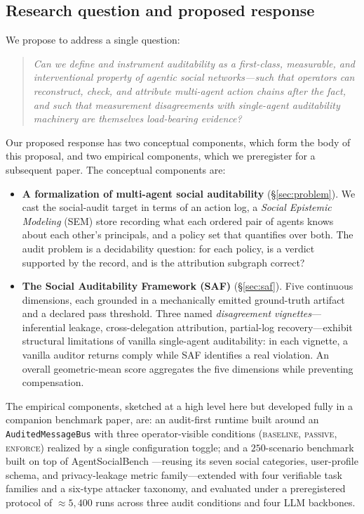 \documentclass{article}
\begin{document}
\subsection{Research question and proposed response}
\label{sec:motivation:rq}

We propose to address a single question:
\begin{quote}
\emph{Can we define and instrument auditability as a first-class, measurable, and interventional property of agentic social networks---such that operators can reconstruct, check, and attribute multi-agent action chains after the fact, and such that measurement disagreements with single-agent auditability machinery are themselves load-bearing evidence?}
\end{quote}

Our proposed response has two conceptual components, which form the body of this proposal, and two empirical components, which we preregister for a subsequent paper. The conceptual components are:

\begin{itemize}
  \item \textbf{A formalization of multi-agent social auditability} (\S\ref{sec:problem}). We cast the social-audit target in terms of an action log, a \emph{Social Epistemic Modeling} (SEM) store recording what each ordered pair of agents knows about each other's principals, and a policy set that quantifies over both. The audit problem is a decidability question: for each policy, is a verdict supported by the record, and is the attribution subgraph correct?
  \item \textbf{The Social Auditability Framework (SAF)} (\S\ref{sec:saf}). Five continuous dimensions, each grounded in a mechanically emitted ground-truth artifact and a declared pass threshold. Three named \emph{disagreement vignettes}---inferential leakage, cross-delegation attribution, partial-log recovery---exhibit structural limitations of vanilla single-agent auditability: in each vignette, a vanilla auditor returns \textsf{comply} while SAF identifies a real violation. An overall geometric-mean score aggregates the five dimensions while preventing compensation.
\end{itemize}

The empirical components, sketched at a high level here but developed fully in a companion benchmark paper, are: an audit-first runtime built around an \texttt{AuditedMessageBus} with three operator-visible conditions (\textsc{baseline}, \textsc{passive}, \textsc{enforce}) realized by a single configuration toggle; and a $250$-scenario benchmark built on top of AgentSocialBench \citep{wang2026agentsocialbench}---reusing its seven social categories, user-profile schema, and privacy-leakage metric family---extended with four verifiable task families and a six-type attacker taxonomy, and evaluated under a preregistered protocol of $\approx 5{,}400$ runs across three audit conditions and four LLM backbones.
\end{document}
